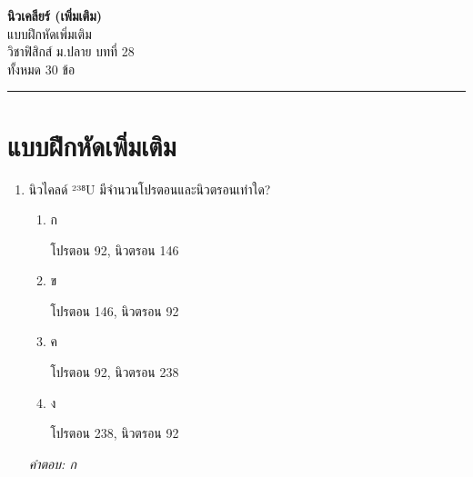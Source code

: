 \documentclass[12pt]{article}
\begin{document}
\begin{center}
{\Large\textbf{นิวเคลียร์ (เพิ่มเติม)}}\\[6pt]
{\normalsize แบบฝึกหัดเพิ่มเติม}\\[6pt]
{\normalsize วิชาฟิสิกส์ ม.ปลาย บทที่ 28}\\[4pt]
{\footnotesize ทั้งหมด 30 ข้อ}
\end{center}
\hrule
\bigskip

\section*{แบบฝึกหัดเพิ่มเติม}
\begin{enumerate}[label=\arabic*., itemsep=0.5\baselineskip, topsep=0.5\baselineskip, leftmargin=*]
\item นิวไคลด์ ²³⁸U มีจำนวนโปรตอนและนิวตรอนเท่าใด?
\begin{enumerate}[label=\alph*)., itemsep=0.3\baselineskip, topsep=0.3\baselineskip]
\item ก\ 
\begin{minipage}[t]{0.9\linewidth}
\raggedright โปรตอน 92, นิวตรอน 146
\end{minipage}
\item ข\ 
\begin{minipage}[t]{0.9\linewidth}
\raggedright โปรตอน 146, นิวตรอน 92
\end{minipage}
\item ค\ 
\begin{minipage}[t]{0.9\linewidth}
\raggedright โปรตอน 92, นิวตรอน 238
\end{minipage}
\item ง\ 
\begin{minipage}[t]{0.9\linewidth}
\raggedright โปรตอน 238, นิวตรอน 92
\end{minipage}
\end{enumerate}
\vspace{-0.3\baselineskip}
\begin{small}
\textit{คำตอบ: ก}
\end{small}


\end{enumerate}
\end{document}
